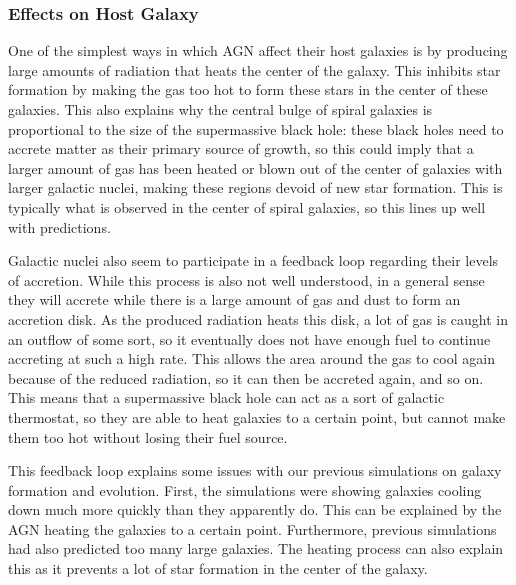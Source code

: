 \documentclass[12pt]{article}
\begin{document}
    \subsubsection{Effects on Host Galaxy}
    One of the simplest ways in which AGN affect their host galaxies is by
    producing large amounts of radiation that heats the center of the galaxy.
    This inhibits star formation by making the gas too hot to form these stars
    in the center of these galaxies.  This also explains why the central bulge
    of spiral galaxies is proportional to the size of the supermassive black
    hole: these black holes need to accrete matter as their primary source of
    growth, so this could imply that a larger amount of gas has been heated or
    blown out of the center of galaxies with larger galactic nuclei, making
    these regions devoid of new star formation.  This is typically what is
    observed in the center of spiral galaxies, so this lines up well with
    predictions.

    Galactic nuclei also seem to participate in a feedback loop regarding their
    levels of accretion.  While this process is also not well understood, in a
    general sense they will accrete while there is a large amount of gas and
    dust to form an accretion disk.  As the produced radiation heats this disk,
    a lot of gas is caught in an outflow of some sort, so it eventually does not
    have enough fuel to continue accreting at such a high rate.  This allows the
    area around the gas to cool again because of the reduced radiation, so it
    can then be accreted again, and so on.  This means that a supermassive
    black hole can act as a sort of galactic thermostat, so they are able to
    heat galaxies to a certain point, but cannot make them too hot without
    losing their fuel source.

    This feedback loop explains some issues with our previous simulations on
    galaxy formation and evolution.  First, the simulations were showing
    galaxies cooling down much more quickly than they apparently do.  This can
    be explained by the AGN heating the galaxies to a certain point.
    Furthermore, previous simulations had also predicted too many large
    galaxies.  The heating process can also explain this as it prevents a lot of
    star formation in the center of the galaxy.
\end{document}
